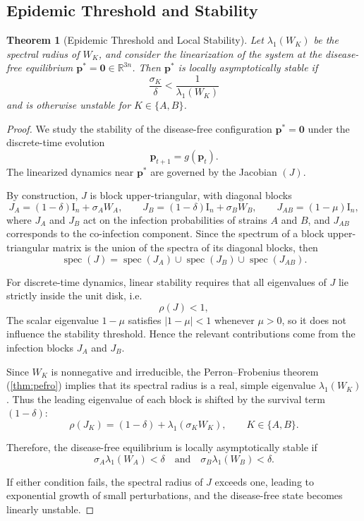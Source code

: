 \documentclass[a4paper,12pt]{scrartcl}
\theoremstyle{plain}%
\newtheorem{theorem}{Theorem}[section]  %
\theoremstyle{definition}
\theoremstyle{remark}
\numberwithin{equation}{section}
\begin{document}
\subsection{Epidemic Threshold and Stability}
\begin{theorem}[Epidemic Threshold and Local Stability]
\label{thm:threshold}
Let $\lambda_1(W_K)$ be the spectral radius of $W_{K}$, and consider the linearization of the system at the disease-free equilibrium $\mathbf{p}^* = \mathbf{0} \in \mathbb{R}^{3n}$.  
Then $\mathbf{p}^*$ is locally asymptotically stable if 
\[
\frac{\sigma_K}{\delta} < \frac{1}{\lambda_{1}(W_K)}
\]
and is otherwise unstable for $K \in \{A,B\}$.
\end{theorem}

\begin{proof}

We study the stability of the disease-free configuration 
\(\mathbf{p}^* = \mathbf{0}\) 
under the discrete-time evolution
\[
\mathbf{p}_{t+1} = g(\mathbf{p}_t).
\]
The linearized dynamics near $\mathbf{p}^*$ are governed by the Jacobian $(J)$. 

By construction, $J$ is block upper-triangular, with diagonal blocks
\[
J_A = (1-\delta) \mathrm{I}_n + \sigma_{A} W_A, 
\qquad
J_B = (1-\delta) \mathrm{I}_n + \sigma_{B} W_B,
\qquad
J_{AB} = (1-\mu)\mathrm{I}_n,
\]
where $J_A$ and $J_B$ act on the infection probabilities of strains $A$ and $B$, and $J_{AB}$ corresponds to the co-infection component. Since the spectrum of a block upper-triangular matrix is the union of the spectra of its diagonal blocks, then
\[
\operatorname{spec}(J) = \operatorname{spec}(J_A) \cup \operatorname{spec}(J_B) \cup \operatorname{spec}(J_{AB}) .
\]

For discrete-time dynamics, linear stability requires that all eigenvalues of $J$ lie strictly inside the unit disk, i.e.
\[
\rho(J) < 1,
\]
The scalar eigenvalue $1-\mu$ satisfies $|1-\mu| < 1$ whenever $\mu>0$, so it does not influence the stability threshold. Hence the relevant contributions come from the infection blocks $J_A$ and $J_B$.

Since $W_K$ is nonnegative and irreducible, the Perron--Frobenius theorem (\ref{thm:pefro}) implies that its spectral radius is a real, simple eigenvalue $\lambda_{1}(W_K)$. Thus the leading eigenvalue of each block is shifted by the survival term $(1-\delta)$:
\[
\rho(J_K) = (1-\delta) + \lambda_{1}(\sigma_{K} W_K), \qquad K \in \{A,B\}.
\]

Therefore, the disease-free equilibrium is locally asymptotically stable if 
\[
\sigma_{A} \lambda_{1}(W_A) < \delta
\quad \text{and} \quad
\sigma_{B} \lambda_{1}(W_B) < \delta.
\]

If either condition fails, the spectral radius of $J$ exceeds one, leading to exponential growth of small perturbations, and the disease-free state becomes linearly unstable.
\end{proof}
\end{document}
